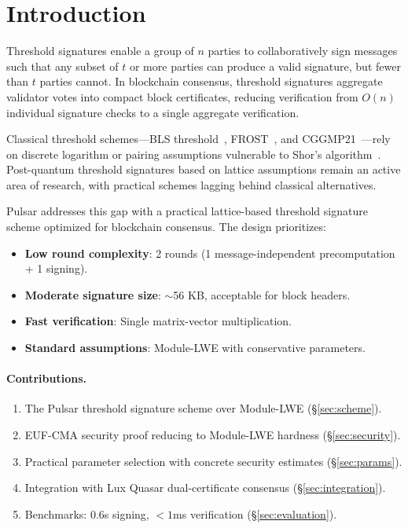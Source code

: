\section{Introduction}

\label{sec:introduction}

Threshold signatures enable a group of $n$ parties to collaboratively sign messages
such that any subset of $t$ or more parties can produce a valid signature, but fewer
than $t$ parties cannot. In blockchain consensus, threshold signatures aggregate
validator votes into compact block certificates, reducing verification from $O(n)$
individual signature checks to a single aggregate verification.

Classical threshold schemes---BLS threshold~\cite{boldyreva2003threshold},
FROST~\cite{komlo2020frost}, and CGGMP21~\cite{canetti2021uc}---rely on discrete
logarithm or pairing assumptions vulnerable to Shor's algorithm~\cite{shor1997polynomial}.
Post-quantum threshold signatures based on lattice assumptions remain an active area
of research, with practical schemes lagging behind classical alternatives.

Pulsar addresses this gap with a practical lattice-based threshold signature scheme
optimized for blockchain consensus. The design prioritizes:
\begin{itemize}[nosep]
\item \textbf{Low round complexity}: 2 rounds (1 message-independent precomputation + 1 signing).
\item \textbf{Moderate signature size}: $\sim$56 KB, acceptable for block headers.
\item \textbf{Fast verification}: Single matrix-vector multiplication.
\item \textbf{Standard assumptions}: Module-LWE with conservative parameters.
\end{itemize}

\paragraph{Contributions.}
\begin{enumerate}[nosep]
\item The Pulsar threshold signature scheme over Module-LWE (\S\ref{sec:scheme}).
\item EUF-CMA security proof reducing to Module-LWE hardness (\S\ref{sec:security}).
\item Practical parameter selection with concrete security estimates (\S\ref{sec:params}).
\item Integration with Lux Quasar dual-certificate consensus (\S\ref{sec:integration}).
\item Benchmarks: 0.6s signing, $< 1$ms verification (\S\ref{sec:evaluation}).
\end{enumerate}

